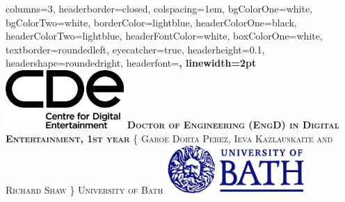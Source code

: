 \documentclass[landscape,a0paper,fontscale=0.285]{baposter} %
\begin{document}
\begin{poster}
{
columns=3,
headerborder=closed, %
colspacing=1em, %
bgColorOne=white, %
bgColorTwo=white, %
borderColor=lightblue, %
headerColorOne=black, %
headerColorTwo=lightblue, %
headerFontColor=white, %
boxColorOne=white, %
textborder=roundedleft, %
eyecatcher=true, %
headerheight=0.1\textheight, %
headershape=roundedright, %
headerfont=\Large\bf\textsc, %
linewidth=2pt %
}
%
{\includegraphics[height=6em]{cde_tag_black.png}} %
{\bf\textsc{Doctor of Engineering (EngD) in Digital Entertainment, 1st year}\vspace{0.5em}} %
{\textsc{\{ Garoe Dorta Perez, Ieva Kazlauskaite and Richard Shaw \} \hspace{12pt} University of Bath}} %
{\includegraphics[height=5em]{Bathlogo.jpg}} %


\end{poster}
\end{document}
